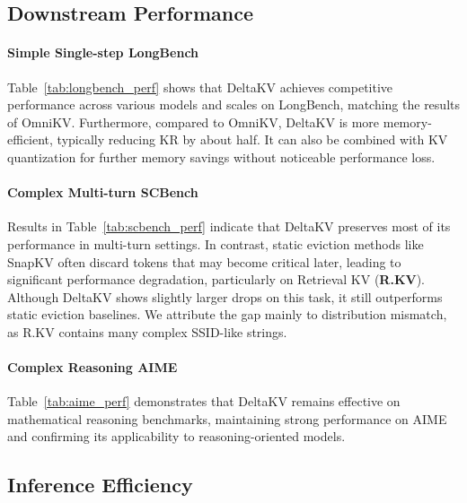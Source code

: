 \subsection{Downstream Performance}
\label{sec:expt:performance}

\vspace{-0.25em}
\paragraph{Simple Single-step LongBench} 
Table~\ref{tab:longbench_perf} shows that DeltaKV achieves competitive performance across various models and scales on LongBench, matching the results of OmniKV. 
Furthermore, compared to OmniKV, DeltaKV is more memory-efficient, typically reducing KR by about half. It can also be combined with KV quantization for further memory savings without noticeable performance loss.

\paragraph{Complex Multi-turn SCBench} 
Results in Table~\ref{tab:scbench_perf} indicate that DeltaKV preserves most of its performance in multi-turn settings. 
In contrast, static eviction methods like SnapKV often discard tokens that may become critical later, leading to significant performance degradation, particularly on Retrieval KV (\textbf{R.KV}).
Although DeltaKV shows slightly larger drops on this task, it still outperforms static eviction baselines. We attribute the gap mainly to distribution mismatch, as R.KV contains many complex SSID-like strings.

\paragraph{Complex Reasoning AIME} 
Table~\ref{tab:aime_perf} demonstrates that DeltaKV remains effective on mathematical reasoning benchmarks, maintaining strong performance on AIME and confirming its applicability to reasoning-oriented models.





\subsection{Inference Efficiency}
\label{sec:expt:efficiency}

